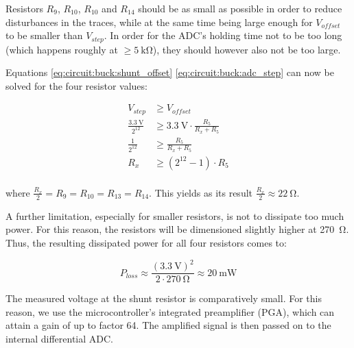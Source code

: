 Resistors  $R_9$, $R_{10}$, $R_{10}$ and  $R_{14}$  should be as small as possible%
in order to  reduce disturbances in the  traces, while at the  same time being
large enough for $V_{offset}$ to be  smaller than $V_{step}$. In order for the
ADC's  holding  time not  to  be  too long  (which  happens  roughly at  $\geq      %
\SI{5}{\kilo\ohm}$), they should however also not be too large.

Equations \ref{eq:circuit:buck:shunt_offset} \ref{eq:circuit:buck:adc_step} can now
be solved for the four resistor values:

\begin{align*}
                          V_{step} &\geq V_{offset} \\
    \frac{\SI{3.3}{\volt}}{2^{12}} &\geq \SI{3.3}{\volt} \cdot \frac{R_5}{R_x + R_5} \\
                  \frac{1}{2^{12}} &\geq \frac{R_5}{R_x + R_5} \\
                               R_x &\geq \left( 2^{12} - 1 \right) \cdot R_5 \\
\end{align*}

where $\frac{R_x}{2} =  R_{9} = R_{10} = R_{13} =  R_{14}$. This yields as its
result $\frac{R_x}{2} \approx \SI{22}{\ohm}$.

A further limitation, especially for smaller resistors, is not to dissipate too much
power. For this reason, the resistors will be dimensioned slightly higher at %
\SI{270}{\ohm}. Thus, the  resulting dissipated  power for  all
four resistors comes to:

\begin{equation*}
    P_{loss} \approx \frac{\left(\SI{3.3}{\volt}\right)^2}{2\cdot \SI{270}{\ohm}} \approx \SI{20}{\milli\watt}
\end{equation*}

The measured  voltage at the  shunt resistor is comparatively  small. For this reason,
we use the microcontroller's integrated preamplifier (PGA), %
which can  attain a  gain of  up to  factor 64. The  amplified signal  is then
passed on to the internal differential ADC.
